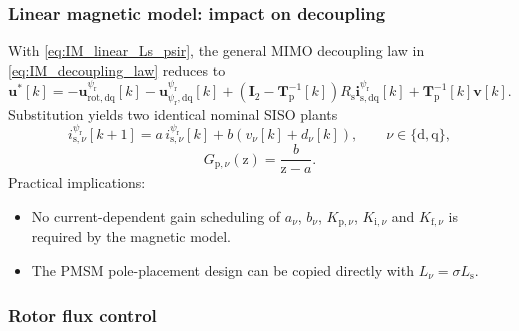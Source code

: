 \begin{frame}
    \frametitle{Linear magnetic model: impact on decoupling}
    With \eqref{eq:IM_linear_Ls_psir}, the general MIMO decoupling law in \eqref{eq:IM_decoupling_law} reduces to
    \begin{equation}
        \bm{u}^{*}[k]
        =-\bm{u}^{\psi_\mathrm{r}}_{\mathrm{rot},\mathrm{dq}}[k]
        -\bm{u}^{\psi_\mathrm{r}}_{\psi_\mathrm{r},\mathrm{dq}}[k]
        +\left(\bm{I}_2-\bm{T}_{\mathrm{p}}^{-1}[k]\right)R_\mathrm{s}\bm{i}^{\psi_\mathrm{r}}_{\mathrm{s},\mathrm{dq}}[k]
        +\bm{T}_{\mathrm{p}}^{-1}[k]\bm{v}[k].
        \label{eq:IM_linear_decoupling_law}
    \end{equation}\pause%
    Substitution yields two identical nominal SISO plants
    \begin{equation}
        i^{\psi_\mathrm{r}}_{\mathrm{s},\nu}[k+1]
        =a\,i^{\psi_\mathrm{r}}_{\mathrm{s},\nu}[k]+b\left(v_\nu[k]+d_\nu[k]\right),
        \qquad \nu\in\{\mathrm{d},\mathrm{q}\},
        \label{eq:IM_linear_siso_plant}
    \end{equation}
    \begin{equation}
        G_{\mathrm{p},\nu}(\mathrm{z})=\frac{b}{\mathrm{z}-a}.
    \end{equation}\pause%
    Practical implications:
    \begin{itemize}
        \item No current-dependent gain scheduling of $a_\nu$, $b_\nu$, $K_{\mathrm{p},\nu}$, $K_{\mathrm{i},\nu}$ and $K_{\mathrm{f},\nu}$ is required by the magnetic model.
        \item The PMSM pole-placement design can be copied directly with $L_\nu=\sigma L_\mathrm{s}$.
    \end{itemize}
\end{frame}

\subsubsection{Rotor flux control}


